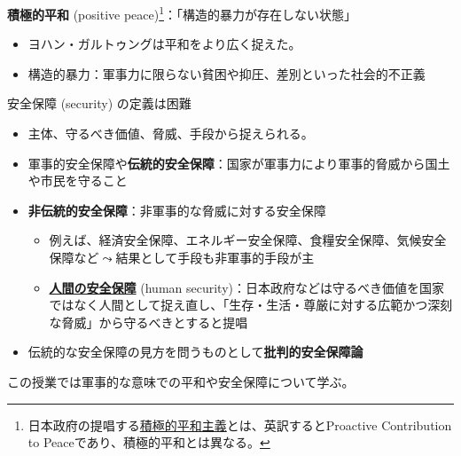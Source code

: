 \documentclass[
  xelatex,
  ja=standard]{bxjsarticle}
\providecommand{\tightlist}{%
  \setlength{\itemsep}{0pt}\setlength{\parskip}{0pt}}\usepackage{longtable,booktabs,array}
\begin{document}
\textbf{積極的平和} (positive
peace)\footnote{日本政府の提唱する\href{https://www.mofa.go.jp/mofaj/p_pd/dpr/page1w_000072.html}{積極的平和主義}とは、英訳するとProactive
  Contribution to Peaceであり、積極的平和とは異なる。}：「構造的暴力が存在しない状態」\citep{galtung1969, galtung1991}

\begin{itemize}
\tightlist
\item
  ヨハン・ガルトゥングは平和をより広く捉えた。
\item
  構造的暴力：軍事力に限らない貧困や抑圧、差別といった社会的不正義
\end{itemize}

安全保障 (security) の定義は困難

\begin{itemize}
\tightlist
\item
  主体、守るべき価値、脅威、手段から捉えられる\citep[第1章]{boudai2018}。
\item
  軍事的安全保障や\textbf{伝統的安全保障}：国家が軍事力により軍事的脅威から国土や市民を守ること
\item
  \textbf{非伝統的安全保障}：非軍事的な脅威に対する安全保障

  \begin{itemize}
  \tightlist
  \item
    例えば、経済安全保障、エネルギー安全保障、食糧安全保障、気候安全保障など\(\leadsto\)結果として手段も非軍事的手段が主
  \item
    \href{https://www.mofa.go.jp/mofaj/gaiko/oda/bunya/security/index.html}{\textbf{人間の安全保障}}
    (human
    security)：日本政府などは守るべき価値を国家ではなく人間として捉え直し、「生存・生活・尊厳に対する広範かつ深刻な脅威」から守るべきとすると提唱\citep{hs2003, sen2006, osa2021}
  \end{itemize}
\item
  伝統的な安全保障の見方を問うものとして\textbf{批判的安全保障論}\citep{minamiyama2022}
\end{itemize}

この授業では軍事的な意味での平和や安全保障について学ぶ。


  
\end{document}
